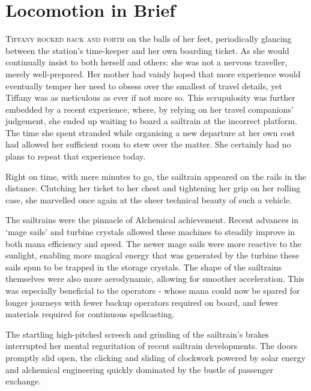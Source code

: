 

\chapter{Locomotion in Brief}
\lettrine{T}{iffany rocked back and forth} on the balls of her feet, periodically glancing between the station's time-keeper and her own boarding ticket. 
As she would continually insist to both herself and others: she was not a nervous traveller, merely well-prepared.
Her mother had vainly hoped that more experience would eventually temper her need to obsess over the smallest of travel details, yet Tiffany was as meticulous as ever if not more so.
This scrupulosity was further embedded by a recent experience, where, by relying on her travel companions' judgement, she ended up waiting to board a sailtrain at the incorrect platform.
The time she spent stranded while organising a new departure at her own cost had allowed her sufficient room to stew over the matter.
She certainly had no plans to repeat that experience today.
\vspace{1mm}

Right on time, with mere minutes to go, the sailtrain appeared on the rails in the distance.
Clutching her ticket to her chest and tightening her grip on her rolling case, she marvelled once again at the sheer technical beauty of such a vehicle.

The sailtrains were the pinnacle of Alchemical achievement.
Recent advances in `mage sails' and turbine crystals allowed these machines to steadily improve in both mana efficiency and speed.
The newer mage sails were more reactive to the sunlight, enabling more magical energy that was generated by the turbine these sails spun to be trapped in the storage crystals.
The shape of the sailtrains themselves were also more aerodynamic, allowing for smoother acceleration.
This was especially beneficial to the operators - whose mana could now be spared for longer journeys with fewer backup operators required on board, and fewer materials required for continuous spellcasting.

The startling high-pitched screech and grinding of the sailtrain's brakes interrupted her mental reguritation of recent sailtrain developments.
The doors promptly slid open, the clicking and sliding of clockwork powered by solar energy and alchemical engineering quickly dominated by the bustle of passenger exchange.

